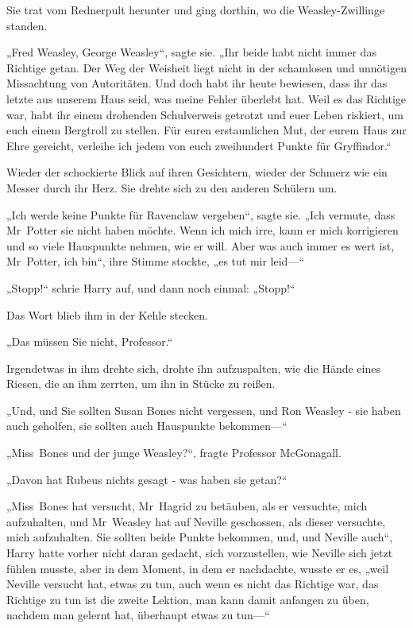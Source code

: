 {Sie trat vom Rednerpult herunter und ging dorthin, wo die Weasley-Zwillinge standen.

„Fred Weasley, George Weasley“, sagte sie. „Ihr beide habt nicht immer das Richtige getan. Der Weg der Weisheit liegt nicht in der schamlosen und unnötigen Missachtung von Autoritäten. Und doch habt ihr heute bewiesen, dass ihr das letzte aus unserem Haus seid, was meine Fehler überlebt hat. Weil es das Richtige war, habt ihr einem drohenden Schulverweis getrotzt und euer Leben riskiert, um euch einem Bergtroll zu stellen. Für euren erstaunlichen Mut, der eurem Haus zur Ehre gereicht, verleihe ich jedem von euch zweihundert Punkte für Gryffindor.“

Wieder der schockierte Blick auf ihren Gesichtern, wieder der Schmerz wie ein Messer durch ihr Herz. Sie drehte sich zu den anderen Schülern um.

„Ich werde keine Punkte für Ravenclaw vergeben“, sagte sie. „Ich vermute, dass Mr~Potter sie nicht haben möchte. Wenn ich mich irre, kann er mich korrigieren und so viele Hauspunkte nehmen, wie er will. Aber was auch immer es wert ist, Mr~Potter, ich bin“, ihre Stimme stockte, „es tut mir leid—“

„Stopp!“ schrie Harry auf, und dann noch einmal: „Stopp!“

Das Wort blieb ihm in der Kehle stecken.

„Das müssen Sie nicht, Professor.“

Irgendetwas in ihm drehte sich, drohte ihn aufzuspalten, wie die Hände eines Riesen, die an ihm zerrten, um ihn in Stücke zu reißen.

„Und, und Sie sollten Susan Bones nicht vergessen, und Ron Weasley - sie haben auch geholfen, sie sollten auch Hauspunkte bekommen—“

„Miss~Bones und der junge Weasley?“, fragte Professor McGonagall.

„Davon hat Rubeus nichts gesagt - was haben sie getan?“

„Miss~Bones hat versucht, Mr~Hagrid zu betäuben, als er versuchte, mich aufzuhalten, und Mr~Weasley hat auf Neville geschossen, als dieser versuchte, mich aufzuhalten. Sie sollten beide Punkte bekommen, und, und Neville auch“, Harry hatte vorher nicht daran gedacht, sich vorzustellen, wie Neville sich jetzt fühlen musste, aber in dem Moment, in dem er nachdachte, wusste er es, „weil Neville versucht hat, etwas zu tun, auch wenn es nicht das Richtige war, das Richtige zu tun ist die zweite Lektion, man kann damit anfangen zu üben, nachdem man gelernt hat, überhaupt etwas zu tun—“

}
